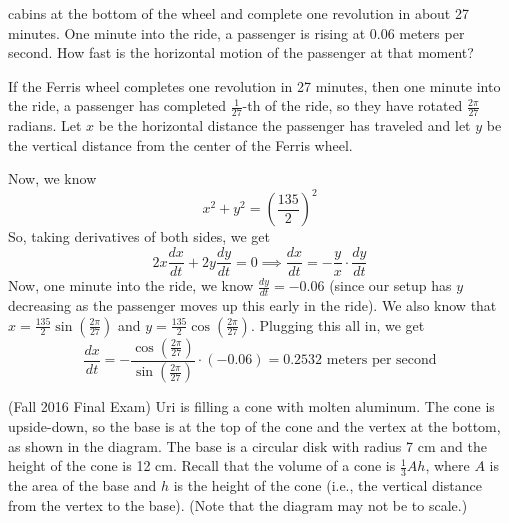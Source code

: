 \documentclass[11pt]{exam}
\begin{document}
\begin{questions}
    cabins at the bottom of the wheel and complete one revolution in
    about 27 minutes. One minute into the ride, a passenger is rising
    at \(0.06\) meters per second. How fast is the horizontal motion
    of the passenger at that moment?
    \begin{solution}
      If the Ferris wheel completes one revolution in 27 minutes, then
      one minute into the ride, a passenger has completed
      \(\frac{1}{27}\)-th of the ride, so they have rotated
      \(\frac{2\pi}{27}\) radians. Let \(x\) be the horizontal
      distance the passenger has traveled and let \(y\) be the
      vertical distance from the center of the Ferris wheel.\\
Now, we know \[
  x^2+y^2 =\left( \frac{135}{2} \right)^2
\]
So, taking derivatives of both sides, we get \[
  2x \frac{dx}{dt} + 2y\frac{dy}{dt} = 0 \implies \frac{dx}{dt} =
  -\frac{y}{x}\cdot \frac{dy}{dt}
\]
Now, one minute into the ride, we know \(\frac{dy}{dt} = -0.06\)
(since our setup has \(y\) decreasing as the passenger moves up this
early in the ride). We also know that \(x = \frac{135}{2} \sin\left(
  \frac{2\pi}{27} \right)\) and \(y = \frac{135}{2} \cos\left(
  \frac{2\pi}{27} \right)\). Plugging this all in, we get \[
  \frac{dx}{dt} = - \frac{\cos\left( \frac{2\pi}{27}
    \right)}{\sin\left( \frac{2\pi}{27} \right)} \cdot (-0.06) =
  0.2532 \text{ meters per second}
\]
    \end{solution}
    \vspace{0.25in}
  \question (Fall 2016 Final Exam) %
Uri is filling a cone with molten aluminum. The cone is upside-down, so the base is at the top of the cone and the vertex at the bottom, as shown in the diagram. The base is a circular disk with radius 7 cm and the height of the cone is 12 cm.
Recall that the volume of a cone is $\frac{1}{3}A h$, where $A$ is the area of the base and $h$ is the height of the cone (i.e., the vertical distance from the vertex to the base). (Note that the diagram may not be to scale.)

\end{questions}
\end{document}
